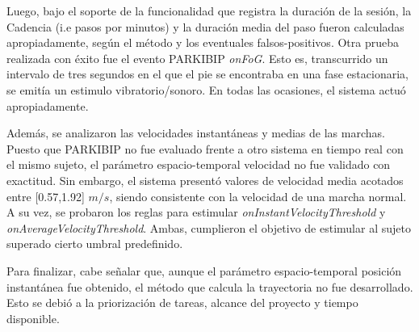 \noindent Luego, bajo el soporte de la funcionalidad que registra la duración de la sesión, la  Cadencia (i.e pasos por minutos) y la duración media del paso fueron calculadas apropiadamente, según el método y los eventuales falsos-positivos.  
\noindent Otra prueba realizada con éxito fue el evento PARKIBIP \textit{onFoG}. Esto es, transcurrido un intervalo de tres segundos en el que el pie se encontraba en una fase estacionaria, se  emitía un estimulo vibratorio/sonoro. En todas las ocasiones, el sistema actuó apropiadamente.

Además, se analizaron las velocidades instantáneas y medias de las marchas. Puesto que PARKIBIP no fue evaluado frente a otro sistema en tiempo real con el mismo sujeto, el parámetro espacio-temporal velocidad no fue validado con exactitud. Sin embargo, el sistema presentó valores de velocidad media acotados entre [0.57,1.92] $m/s$, siendo consistente con la velocidad de una marcha normal. A su vez, se probaron los reglas para estimular \textit{onInstantVelocityThreshold} y \textit{onAverageVelocityThreshold}. Ambas, cumplieron el objetivo de estimular al sujeto superado cierto umbral predefinido.

Para finalizar, cabe señalar que, aunque el parámetro espacio-temporal posición instantánea fue obtenido, el método que calcula la trayectoria no fue desarrollado. Esto se debió a la priorización de tareas, alcance del proyecto y tiempo disponible.